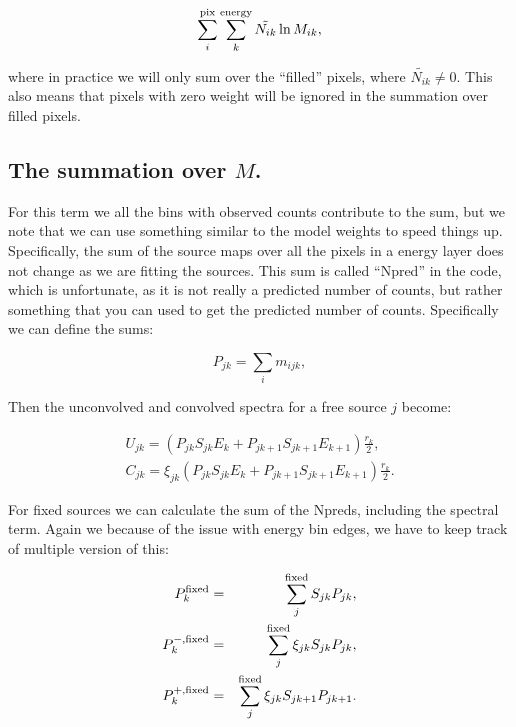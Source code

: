 \documentclass[preprint]{aastex}
\begin{document}
\begin{equation}
  \sum_i^{\rm pix} \sum_k^{\rm energy} \tilde{N_{ik}} \ln M_{ik},
\end{equation}

\noindent where in practice we will only sum over the ``filled''
pixels, where $\tilde{N_{ik}} \ne 0$.  This also means that 
pixels with zero weight will be ignored in the summation over
filled pixels. 


\subsection{The summation over \texorpdfstring{$M$}{M}.}\label{subsec:like_sum2}

For this term we all the bins with observed counts contribute to the
sum, but we note that we can use something similar to the model
weights to speed things up.  Specifically, the sum of the source maps
over all the pixels in a energy layer does not change as we are fitting
the sources.  This sum is called ``Npred'' in the code, which is
unfortunate, as it is not really a predicted number of counts, but
rather something that you can used to get the predicted number of
counts.  Specifically we can define the sums:

\begin{equation}
  P_{jk} = \sum_i m_{ijk},
\end{equation}

\noindent Then the unconvolved and convolved spectra for a free
source $j$ become:

\begin{eqnarray}\label{eq:spectra_no_weights}
  U_{jk} = ( P_{jk} S_{jk} E_k + P_{jk+1} S_{jk+1} E_{k+1} ) \frac{r_k}{2},  \nonumber \\
  C_{jk} = \xi_{jk} ( P_{jk} S_{jk} E_k + P_{jk+1} S_{jk+1} E_{k+1} ) \frac{r_k}{2}.
\end{eqnarray}

For fixed sources we can calculate the sum of the Npreds, including the
spectral term.  Again we because of the issue with energy bin edges, 
we have to keep track of multiple version of this:

\begin{eqnarray}
  P_{k}^{\rm fixed} & = & \sum_j^{\rm fixed} S_{jk} P_{jk}, \nonumber \\
  P_{k}^{-, \rm fixed} & = & \sum_j^{\rm fixed} \xi_{jk} S_{jk} P_{jk},  \nonumber \\
  P_{k}^{+, \rm fixed} & = & \sum_j^{\rm fixed} \xi_{jk} S_{jk+1} P_{jk+1}.
\end{eqnarray}
\end{document}
